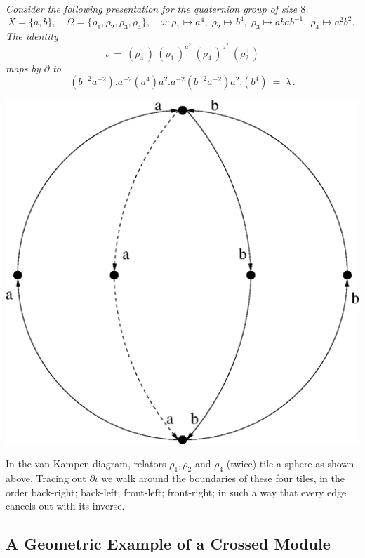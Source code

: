 \bigskip
\begin{example}
\emph{Consider the following presentation for the quaternion group 
of size $8$.}
$$
X = \{a,b\}, \quad
\Omega = \{\rho_1,\rho_2,\rho_3,\rho_4\}, \quad
\omega : \rho_1 \mapsto a^4,\; \rho_2 \mapsto b^4,\; 
\rho_3 \mapsto abab^{-1},\; \rho_4 \mapsto a^2b^2.\; 
$$
\emph{The identity}
$$
\iota ~=~ (\rho_4^-)\ (\rho_1^+)^{a^2}\ (\rho_4^-)^{a^2}\ (\rho_2^+)
$$
\emph{maps by $\partial$ to}
$$
(b^{-2}a^{-2}).a^{-2}(a^4)a^2.a^{-2}(b^{-2}a^{-2})a^2.(b^4) ~=~ \lambda\,.
$$
\end{example}

\bigskip
\begin{center}
\includegraphics[scale = 0.5]{xmodcat1/q8-vankampen.eps}
\end{center}

In the van Kampen diagram, relators $\rho_1, \rho_2$ and $\rho_4$ (twice) 
tile a sphere as shown above. 
Tracing out $\partial \iota$ we walk around the boundaries of these four tiles, 
in the order back-right; back-left; front-left; front-right;
in such a way that every edge cancels out with its inverse. 


\bigskip 
\subsection{A Geometric Example of a Crossed Module} \label{subs:geom-ex}

